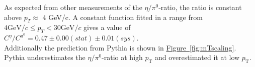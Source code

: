 As expected from other measurements of the $\eta/\pi^{0}$-ratio, the ratio is constant above $p_{T} \approx$ 4 GeV/c. A constant function fitted in a range from $4 \text{GeV}/c \leq p_{T} < 30 \text{GeV}/c$ gives a value of $C^{\eta}/C^{\pi^0}=0.47 \pm 0.00 (stat) \pm 0.01 (sys)$.\\
Additionally the prediction from Pythia is shown in  \hyperref[fig:mTscaling]{Figure~\ref*{fig:mTscaling}}. Pythia underestimates the $\eta/\pi^{0}$-ratio at high $p_{\text{T}}$ and overestimated it at low $p_{\text{T}}$.
%
%
%
%
